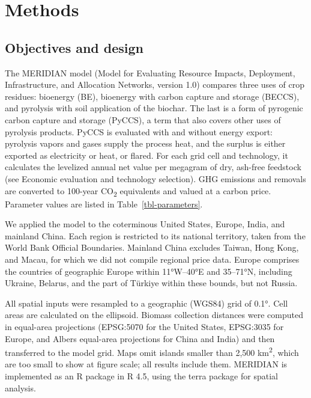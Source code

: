 \documentclass[
  letterpaper,
  twoside,
  twocolumn,
  9pt]{article}
\begin{document}
\section{Methods}\label{methods}

\subsection{Objectives and design}\label{objectives-and-design}

The MERIDIAN model (Model for Evaluating Resource Impacts, Deployment,
Infrastructure, and Allocation Networks, version 1.0) compares three
uses of crop residues: bioenergy (BE), bioenergy with carbon capture and
storage (BECCS), and pyrolysis with soil application of the biochar. The
last is a form of pyrogenic carbon capture and storage (PyCCS), a term
that also covers other uses of pyrolysis
products.\citep{schmidt2019pyccs} PyCCS is evaluated with and without
energy export: pyrolysis vapors and gases supply the process heat, and
the surplus is either exported as electricity or heat, or flared. For
each grid cell and technology, it calculates the levelized annual net
value per megagram of dry, ash-free feedstock (see Economic evaluation
and technology selection). GHG emissions and removals are converted to
100-year CO\textsubscript{2} equivalents and valued at a carbon price.
Parameter values are listed in Table~\ref{tbl-parameters}.

We applied the model to the coterminous United States, Europe, India,
and mainland China. Each region is restricted to its national territory,
taken from the World Bank Official
Boundaries.\citep{worldbank2026boundaries} Mainland China excludes
Taiwan, Hong Kong, and Macau, for which we did not compile regional
price data. Europe comprises the countries of geographic Europe within
11°W--40°E and 35--71°N, including Ukraine, Belarus, and the part of
Türkiye within these bounds, but not Russia.

All spatial inputs were resampled to a geographic (WGS84) grid of 0.1°.
Cell areas are calculated on the ellipsoid. Biomass collection distances
were computed in equal-area projections (EPSG:5070 for the United
States, EPSG:3035 for Europe, and Albers equal-area projections for
China and India) and then transferred to the model grid. Maps omit
islands smaller than 2,500 km\textsuperscript{2}, which are too small to
show at figure scale; all results include them. MERIDIAN is implemented
as an R package in R 4.5,\citep{rcore2025} using the terra package for
spatial analysis.\citep{hijmans2025terra}
\end{document}
